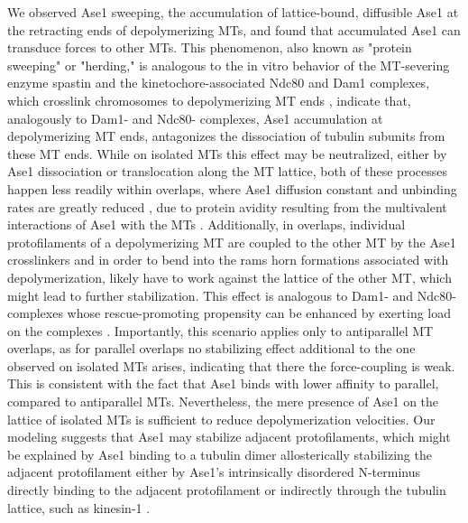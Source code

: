 We observed Ase1 sweeping, the accumulation of lattice-bound, diffusible Ase1 at the retracting ends of depolymerizing MTs, and found that accumulated Ase1 can transduce forces to other MTs. This phenomenon, also known as "protein sweeping" or "herding," is analogous to the in vitro behavior of the MT-severing enzyme spastin and the kinetochore-associated Ndc80 and Dam1 complexes, which crosslink chromosomes to depolymerizing MT ends \parencite{Franck2007, umbreit2012ndc80, grishchuk2017biophysics}, indicate that, analogously to Dam1- and Ndc80- complexes, Ase1 accumulation at depolymerizing MT ends, antagonizes the dissociation of tubulin subunits from these MT ends. While on isolated MTs this effect may be neutralized, either by Ase1 dissociation or translocation along the MT lattice, both of these processes happen less readily within overlaps, where Ase1 diffusion constant and unbinding rates are greatly reduced \parencite{Kapitein2008, lanskydiffusible2015}, due to protein avidity resulting from the multivalent interactions of Ase1 with the MTs \parencite{braun2020cytoskeletal, erlendsson2021binding}. Additionally, in overlaps, individual protofilaments of a depolymerizing MT are coupled to the other MT by the Ase1 crosslinkers and in order to bend into the rams horn formations associated with depolymerization, likely have to work against the lattice of the other MT, which might lead to further stabilization. This effect is analogous to Dam1- and Ndc80- complexes whose rescue-promoting propensity can be enhanced by exerting load on the complexes \parencite{Franck2007, volkov2018multivalency}. Importantly, this scenario applies only to antiparallel MT overlaps, as for parallel overlaps no stabilizing effect additional to the one observed on isolated MTs arises, indicating that there the force-coupling is weak. This is consistent with the fact that Ase1 binds with lower affinity to parallel, compared to antiparallel MTs. Nevertheless, the mere presence of Ase1 on the lattice of isolated MTs is sufficient to reduce depolymerization velocities. Our modeling suggests that Ase1 may stabilize adjacent protofilaments, which might be explained by Ase1 binding to a tubulin dimer allosterically stabilizing the adjacent protofilament either by Ase1's intrinsically disordered N-terminus directly binding to the adjacent protofilament \parencite{Subramanian2010} or indirectly through the tubulin lattice, such as kinesin-1 \parencite{Peet2018, morikawa2015x}. 

